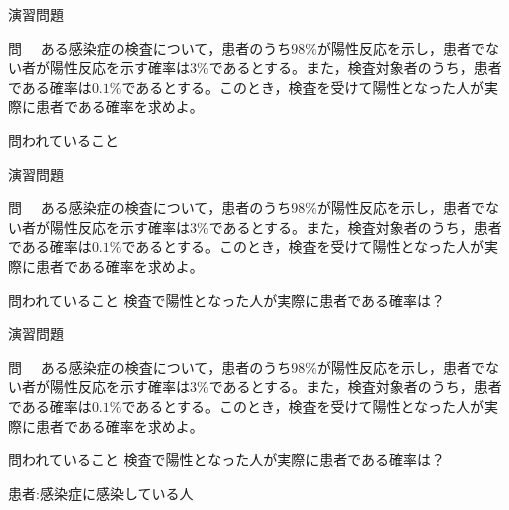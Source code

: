 \documentclass[aspectratio=169, dvipdfmx, 11pt]{beamer}
\begin{document}
\begin{frame}{演習問題}
\begin{block}{問}
　ある感染症の検査について，患者のうち$98\%$が陽性反応を示し，患者でない者が陽性反応を示す確率は$3\%$であるとする。また，検査対象者のうち，患者である確率は$0.1\%$であるとする。このとき，検査を受けて陽性となった人が実際に患者である確率を求めよ。
\end{block}

\begin{alertblock}{問われていること}
\end{alertblock}

\end{frame}


\begin{frame}{演習問題}

\begin{block}{問}
　ある感染症の検査について，患者のうち$98\%$が陽性反応を示し，患者でない者が陽性反応を示す確率は$3\%$であるとする。また，検査対象者のうち，患者である確率は$0.1\%$であるとする。このとき，検査を受けて陽性となった人が実際に患者である確率を求めよ。
\end{block}

\begin{alertblock}{問われていること}
検査で陽性となった人が実際に患者である確率は？
\end{alertblock}

\end{frame}


\begin{frame}{演習問題}

\begin{block}{問}
　ある感染症の検査について，患者のうち$98\%$が陽性反応を示し，患者でない者が陽性反応を示す確率は$3\%$であるとする。また，検査対象者のうち，患者である確率は$0.1\%$であるとする。このとき，検査を受けて陽性となった人が実際に患者である確率を求めよ。
\end{block}

\begin{alertblock}{問われていること}
検査で陽性となった人が実際に患者である確率は？
\end{alertblock}

\begin{tcolorbox}[colframe=blue,
    colback=blue!10!white,
    colbacktitle=blue!40!white,
    coltitle=black, fonttitle=\bfseries,
    title=言葉の説明]
患者:感染症に感染している人
\end{tcolorbox}

\end{frame}
\end{document}

